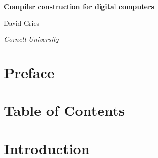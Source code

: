 \documentclass{article}
\begin{document}
	
	\begin{titlepage}
		\centering
		\vspace{15cm}
		{\Huge\bfseries Compiler construction for digital computers\par}
		\vspace{8cm}
		{\huge David Gries\par}
		{\Large\itshape Cornell University\par}
		\vfill
	\end{titlepage}
	
	\section*{\hfil Preface \hfil}
	
	
	\newpage
	
	\section*{\hfil Table of Contents \hfil}
	\vspace{1cm}
	

	\section*{\hfil Introduction \hfil}
	\vspace{1cm}
	
	
	\pagebreak
\end{document}
